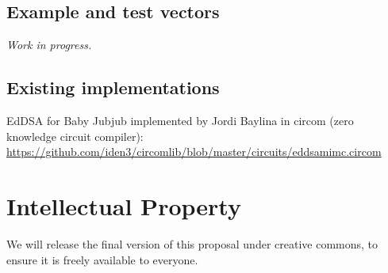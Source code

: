 \documentclass{article}
\begin{document}
\begin{spacing}{1.2}
	\subsection{Example and test vectors}
	{\it Work in progress.}
	\subsection{Existing implementations}
	EdDSA for Baby Jubjub implemented by Jordi Baylina in circom (zero knowledge circuit compiler):\\ \url{https://github.com/iden3/circomlib/blob/master/circuits/eddsamimc.circom}
\section {Intellectual Property}	
We will release the final version of this proposal under creative commons, to ensure it is freely available
to everyone.



\end{spacing}
\end{document}
